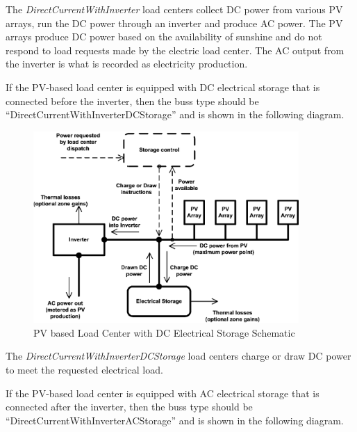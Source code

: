 The \emph{DirectCurrentWithInverter} load centers collect DC power from various PV arrays, run the DC power through an inverter and produce AC power. The PV arrays produce DC power based on the availability of sunshine and do not respond to load requests made by the electric load center. The AC output from the inverter is what is recorded as electricity production.

If the PV-based load center is equipped with DC electrical storage that is connected before the inverter, then the buss type should be ``DirectCurrentWithInverterDCStorage'' and is shown in the following diagram.

\begin{figure}[hbtp] %
\centering
\includegraphics[width=0.9\textwidth, height=0.9\textheight, keepaspectratio=true]{media/image7483.png}
\caption{PV based Load Center with DC Electrical Storage Schematic \protect \label{fig:pv-based-load-center-with-dc-electrical}}
\end{figure}

The \emph{DirectCurrentWithInverterDCStorage} load centers charge or draw DC power to meet the requested electrical load.

If the PV-based load center is equipped with AC electrical storage that is connected after the inverter, then the buss type should be ``DirectCurrentWithInverterACStorage'' and is shown in the following diagram.

